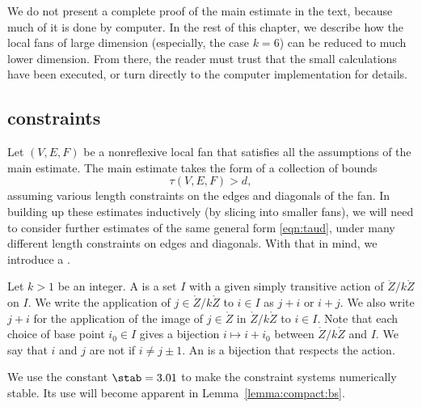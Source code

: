 We do not present a complete proof of the main estimate in the text,
because much of it is done by computer.  In the rest of this chapter,
we describe how the local fans of large dimension (especially, the case $k=6$)
can be reduced to much lower dimension.  From there, the reader must
trust that the small calculations have been executed, or turn directly to
the computer implementation for details.

\subsection{constraints}

Let $(V,E,F)$ be a nonreflexive local fan that satisfies all the assumptions
of the main estimate.  The main estimate takes the form of a collection of
bounds
\begin{equation}\label{eqn:taud}
\tau(V,E,F) > d,
\end{equation}
assuming various length constraints on the edges and diagonals of the fan.
In building up these estimates inductively (by slicing into
smaller fans), we will need to consider further estimates of the same
general form \eqref{eqn:taud}, under many different length constraints on
edges and diagonals.
With that in mind, we introduce a .
%

\begin{definition}
  Let $k>1$ be an integer.  A  is a set $I$ with a
  given simply transitive action of $\ring{Z}/k\ring{Z}$ on $I$.  We
  write the application of $j\in\ring{Z}/k\ring{Z}$ to $i\in I$ as
  $j+i$ or $i+j$.  We also write $j+i$
  for the application of the image of $j\in\ring{Z}$ in $\ring{Z}/k\ring{Z}$ to
  $i\in I$.  Note that each choice of base point $i_0\in I$ gives a
  bijection $i\mapsto i+i_0$ between $\ring{Z}/k\ring{Z}$ and $I$.  
  We say that $i$ and $j$ are not  if $i\ne j\pm 1$.
  An
 is a bijection that respects the action.
%
\end{definition}

We use the constant $\stab=3.01$ to make the constraint systems
numerically stable.  Its use will become apparent in
Lemma~\ref{lemma:compact:bs}.  
%
%


